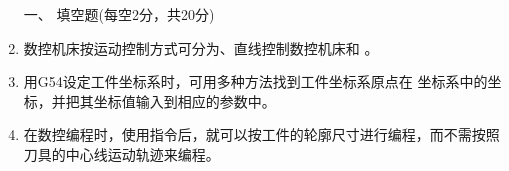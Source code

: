 \documentclass[12pt,twocolumn,landscape,UTF8,twoside]{ctexart}
\begin{document}
\begin{spacing}{1.3}
	\begin{enumerate} [1、]
		\item[\heiti 一、] {\heiti 填空题(每空2分，共20分)}
		
		\item 数控机床按运动控制方式可分为、直线控制数控机床和	。
		
		
		
		

		\item 用G54设定工件坐标系时，可用多种方法找到工件坐标系原点在 坐标系中的坐标，并把其坐标值输入到相应的参数中。


		\item 在数控编程时，使用指令后，就可以按工件的轮廓尺寸进行编程，而不需按照刀具的中心线运动轨迹来编程。
		



		

\end{enumerate}
\end{spacing}
\end{document}
